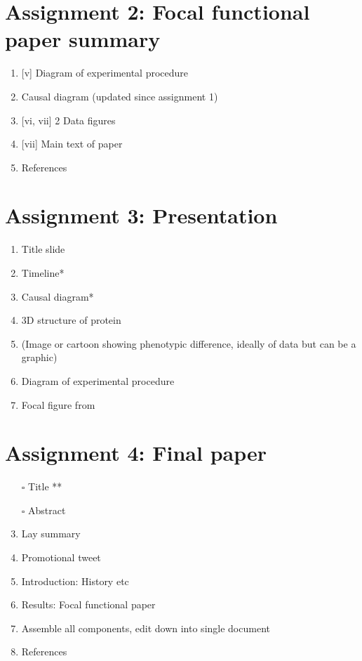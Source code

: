 \documentclass[
]{book}
\providecommand{\tightlist}{%
  \setlength{\itemsep}{0pt}\setlength{\parskip}{0pt}}
\begin{document}
\hypertarget{assignment-2-focal-functional-paper-summary}{%
\chapter{Assignment 2: Focal functional paper summary}\label{assignment-2-focal-functional-paper-summary}}

\begin{enumerate}
\def\labelenumi{\arabic{enumi}.}
\tightlist
\item
  {[}v{]} Diagram of experimental procedure
\item
  Causal diagram (updated since assignment 1)
\item
  {[}vi, vii{]} 2 Data figures
\item
  {[}vii{]} Main text of paper
\item
  References
\end{enumerate}

\hypertarget{assignment-3-presentation}{%
\chapter{Assignment 3: Presentation}\label{assignment-3-presentation}}

\begin{enumerate}
\def\labelenumi{\arabic{enumi}.}
\tightlist
\item
  Title slide
\item
  Timeline*
\item
  Causal diagram*
\item
  3D structure of protein
\item
  (Image or cartoon showing phenotypic difference, ideally of data but can be a graphic)
\item
  Diagram of experimental procedure
\item
  Focal figure from
\end{enumerate}

\hypertarget{assignment-4-final-paper}{%
\chapter{Assignment 4: Final paper}\label{assignment-4-final-paper}}

\begin{enumerate}
\def\labelenumi{\arabic{enumi}.}
\tightlist
\item[$\square$]
  Title **
\item[$\square$]
  Abstract
\item
  Lay summary
\item
  Promotional tweet
\item
  Introduction: History etc
\item
  Results: Focal functional paper
\item
  Assemble all components, edit down into single document
\item
  References
\end{enumerate}
\end{document}
